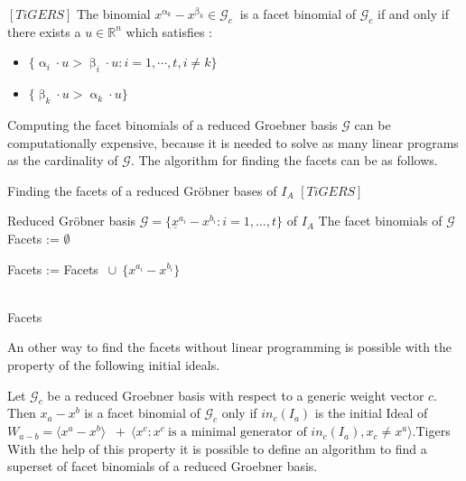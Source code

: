 \begin{env_definition}
$\left[TiGERS \right]  $ 
The binomial $x^{\upalpha_{k}}-x^{\upbeta_k} \in \mathcal{G}_c~$ is a facet binomial of $\mathcal{G}_c$ if and only if there exists a $u \in \mathbb{R}^{n}$ which satisfies :

\begin{itemize}
\item
$ \lbrace \upalpha_{i} \cdot u > \upbeta_{i} \cdot u : i = 1, \cdots , t, i \neq k \rbrace  
$
\item
$ \lbrace \upbeta_{k} \cdot u > \upalpha_{k} \cdot u \rbrace $
\end{itemize}


\end{env_definition}
Computing the facet binomials of a reduced Groebner basis $\mathcal{G}$ can be computationally expensive, because it is needed to solve as many linear programs as the cardinality of $\mathcal{G}$. The algorithm for finding the facets can be as follows.



\begin{algorithm}
\caption{Finding the facets of a reduced Gröbner bases of $I_A$ $\left[ TiGERS\right]  $}
\label{alg:facetsLP}
\begin{algorithmic}[1]

\Require
Reduced Gröbner basis $ \mathcal{G} = \lbrace \underline{x}^{a_{i}} - {x}^{b_{i}} : i = 1,\dots,t  \rbrace $ of $I_A$
\Ensure The facet binomials of $\mathcal{G}$
\State Facets := $\emptyset$

\State Facets := Facets $~\cup~\{{x}^{a_{i}} - {x}^{b_{i}} \} $
\EndIf

\EndFor \\
\Return Facets
\end{algorithmic}
\end{algorithm}


An other way to find the facets without linear programming is possible with the property of the following initial ideals.

Let $\mathcal{G}_{c} $ be a reduced Groebner basis with respect to a generic weight vector $c$. Then $x_{a} - x^{b}$ is a facet binomial of $\mathcal{G}_{c}$ only if $in_{c}(I_{a}) $ is the initial Ideal of $W_{a - b} = \langle x^{a}-x^{b}\rangle$
$~+~ \langle x^{c}  : x^{c}~\textrm{is a minimal generator of~} in_{c}(I_{a}), x_{c} \neq x^{a} \rangle$.Tigers
With the help of this property it is possible to define an algorithm to find a superset of facet binomials of a reduced Groebner basis.

